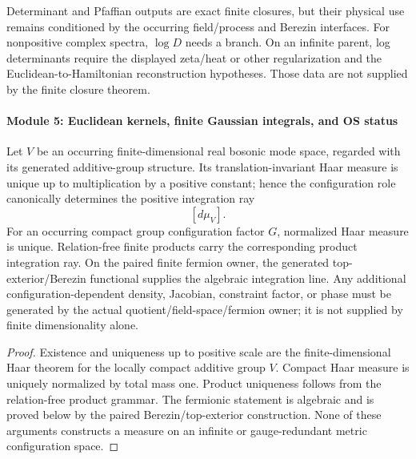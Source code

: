 \documentclass[12pt,a4paper]{article}
\begin{document}
\begin{remark}
Determinant and Pfaffian outputs are exact finite closures, but their physical
use remains conditioned by the occurring field/process and Berezin
interfaces.  For nonpositive complex spectra, \(\log D\) needs a branch.  On
an infinite parent, log determinants require the displayed zeta/heat or other
regularization and the Euclidean-to-Hamiltonian reconstruction hypotheses.
Those data are not supplied by the finite closure theorem.
\end{remark}

\paragraph{Module 5: Euclidean kernels, finite Gaussian integrals, and OS status}
\label{p4:sec:module-finite-euclidean-path-integral}

\begin{theorem}
\label{p4:thm:finite-reference-integration-ray}
Let $V$ be an occurring finite-dimensional real bosonic mode space, regarded
with its generated additive-group structure.  Its translation-invariant Haar
measure is unique up to multiplication by a positive constant; hence the
configuration role canonically determines the positive integration ray
\[
 [d\mu_V].
\]
For an occurring compact group configuration factor $G$, normalized Haar
measure is unique.  Relation-free finite products carry the corresponding
product integration ray.  On the paired finite fermion owner, the generated
top-exterior/Berezin functional supplies the algebraic integration line.
Any additional configuration-dependent density, Jacobian, constraint factor,
or phase must be generated by the actual quotient/field-space/fermion owner;
it is not supplied by finite dimensionality alone.
\end{theorem}

\begin{proof}
Existence and uniqueness up to positive scale are the finite-dimensional Haar
theorem for the locally compact additive group $V$.  Compact Haar measure is
uniquely normalized by total mass one.  Product uniqueness follows from the
relation-free product grammar.  The fermionic statement is algebraic and is
proved below by the paired Berezin/top-exterior construction.  None of these
arguments constructs a measure on an infinite or gauge-redundant metric
configuration space.
\end{proof}
\end{document}
